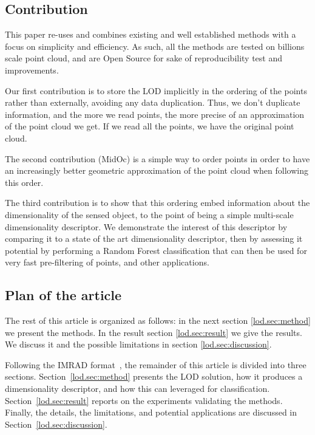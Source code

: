 \subsection{Contribution}

	This paper re-uses and combines existing and well established methods with a focus on simplicity and efficiency. As such, all the methods are tested on billions scale point cloud, and are Open Source for sake of reproducibility test and improvements.
	
	Our first contribution is to store the LOD implicitly in the ordering of the points rather than externally, avoiding any data duplication.
	Thus, we don't duplicate information, and the more we read points, the more precise of an approximation of the point cloud we get. If we read all the points, we have the original point cloud.
	
	The second contribution (MidOc) is a simple way to order points in order to have an increasingly better geometric approximation of the point cloud when following this order.
	
	The third contribution is to show that this ordering embed information about the dimensionality of the sensed object,
	to the point of being a simple multi-scale dimensionality descriptor.
	We demonstrate the interest of this descriptor by comparing it to a state of the art dimensionality descriptor, then by assessing it potential by performing a Random Forest classification that can then be used for very fast pre-filtering of points, and other applications.
		
	
\subsection{Plan of the article}
	The rest of this article is organized as follows:
	in the next section \ref{lod.sec:method} we present the methods.  
	In the result section \ref{lod.sec:result} we give the results.
	We discuss it and the possible limitations in section \ref{lod.sec:discussion}.
	
	Following the IMRAD format~\citep{Wu2011}, the remainder of this article is divided into three sections.
	Section~\ref{lod.sec:method} presents the LOD solution, how it produces a dimensionality descriptor, and how this can leveraged for classification.  
	Section~\ref{lod.sec:result} reports on the experiments validating the methods.
	Finally, the details, the limitations, and potential applications are discussed in Section~\ref{lod.sec:discussion}.
	
